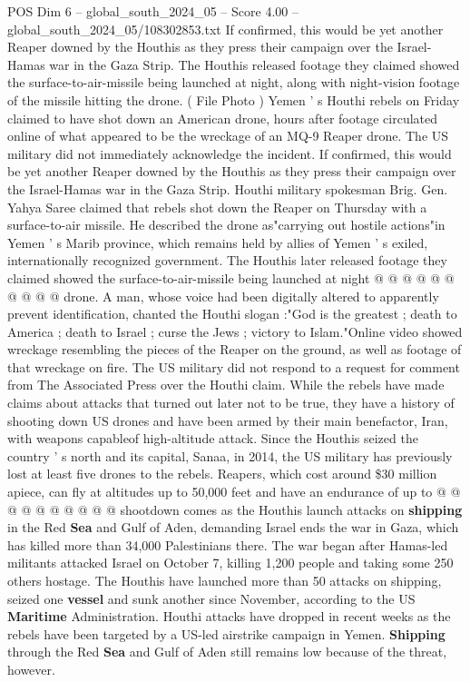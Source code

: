 \begin{textsample}{POS Dim 6 – global\_south\_2024\_05 – Score 4.00 – global\_south\_2024\_05/108302853.txt}  \label{ex:f6_pos_217}
If confirmed, this would be yet another Reaper downed by the Houthis as they press their campaign over the Israel-Hamas war in the Gaza Strip.
The Houthis released footage they claimed showed the surface-to-air-missile being launched at night, along with night-vision footage of the missile hitting the drone. ( File Photo ) Yemen ' s Houthi rebels on Friday claimed to have shot down an American drone, hours after footage circulated online of what appeared to be the wreckage of an MQ-9 Reaper drone.
The US military did not immediately acknowledge the incident.
If confirmed, this would be yet another Reaper downed by the Houthis as they press their campaign over the Israel-Hamas war in the Gaza Strip.
Houthi military spokesman Brig.
Gen.
Yahya Saree claimed that rebels shot down the Reaper on Thursday with a surface-to-air missile.
He described the drone as"carrying out hostile actions"in Yemen ' s Marib province, which remains held by allies of Yemen ' s exiled, internationally recognized government.
The Houthis later released footage they claimed showed the surface-to-air-missile being launched at night @ @ @ @ @ @ @ @ @ @ drone.
A man, whose voice had been digitally altered to apparently prevent identification, chanted the Houthi slogan :"God is the greatest ; death to America ; death to Israel ; curse the Jews ; victory to Islam."Online video showed wreckage resembling the pieces of the Reaper on the ground, as well as footage of that wreckage on fire.
The US military did not respond to a request for comment from The Associated Press over the Houthi claim.
While the rebels have made claims about attacks that turned out later not to be true, they have a history of shooting down US drones and have been armed by their main benefactor, Iran, with weapons capableof high-altitude attack.
Since the Houthis seized the country ' s north and its capital, Sanaa, in 2014, the US military has previously lost at least five drones to the rebels.
Reapers, which cost around \$30 million apiece, can fly at altitudes up to 50,000 feet and have an endurance of up to @ @ @ @ @ @ @ @ @ @ shootdown comes as the Houthis launch attacks on \textbf{shipping} in the Red \textbf{Sea} and Gulf of Aden, demanding Israel ends the war in Gaza, which has killed more than 34,000 Palestinians there.
The war began after Hamas-led militants attacked Israel on October 7, killing 1,200 people and taking some 250 others hostage.
The Houthis have launched more than 50 attacks on shipping, seized one \textbf{vessel} and sunk another since November, according to the US \textbf{Maritime} Administration.
Houthi attacks have dropped in recent weeks as the rebels have been targeted by a US-led airstrike campaign in Yemen. \textbf{Shipping} through the Red \textbf{Sea} and Gulf of Aden still remains low because of the threat, however.

\end{textsample}
